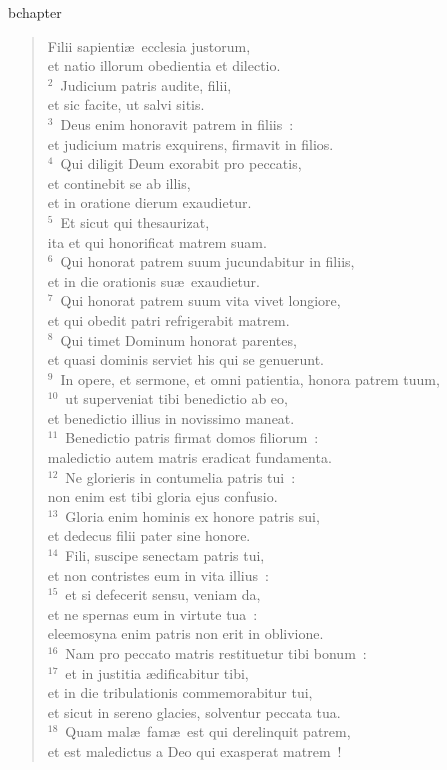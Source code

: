 bchapter\begin{verse}\vspace{-19pt}Filii sapienti\ae\ ecclesia justorum,\\ et natio illorum obedientia et dilectio.\\
${}^{2}$~Judicium patris audite, filii,\\ et sic facite, ut salvi sitis.\\
${}^{3}$~Deus enim honoravit patrem in filiis~:\\ et judicium matris exquirens, firmavit in filios.\\
${}^{4}$~Qui diligit Deum exorabit pro peccatis,\\ et continebit se ab illis,\\ et in oratione dierum exaudietur.\\
${}^{5}$~Et sicut qui thesaurizat,\\ ita et qui honorificat matrem suam.\\
${}^{6}$~Qui honorat patrem suum jucundabitur in filiis,\\ et in die orationis su\ae\ exaudietur.\\
${}^{7}$~Qui honorat patrem suum vita vivet longiore,\\ et qui obedit patri refrigerabit matrem.\\
${}^{8}$~Qui timet Dominum honorat parentes,\\ et quasi dominis serviet his qui se genuerunt.\\
${}^{9}$~In opere, et sermone, et omni patientia, honora patrem tuum,\\
${}^{10}$~ut superveniat tibi benedictio ab eo,\\ et benedictio illius in novissimo maneat.\\
${}^{11}$~Benedictio patris firmat domos filiorum~:\\ maledictio autem matris eradicat fundamenta.\\
${}^{12}$~Ne glorieris in contumelia patris tui~:\\ non enim est tibi gloria ejus confusio.\\
${}^{13}$~Gloria enim hominis ex honore patris sui,\\ et dedecus filii pater sine honore.\\
${}^{14}$~Fili, suscipe senectam patris tui,\\ et non contristes eum in vita illius~:\\
${}^{15}$~et si defecerit sensu, veniam da,\\ et ne spernas eum in virtute tua~:\\ eleemosyna enim patris non erit in oblivione.\\
${}^{16}$~Nam pro peccato matris restituetur tibi bonum~:\\
${}^{17}$~et in justitia \ae dificabitur tibi,\\ et in die tribulationis commemorabitur tui,\\ et sicut in sereno glacies, solventur peccata tua.\\
${}^{18}$~Quam mal\ae\ fam\ae\ est qui derelinquit patrem,\\ et est maledictus a Deo qui exasperat matrem~!\end{verse}


